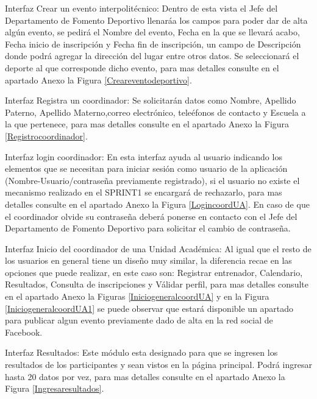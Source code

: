 	\noindent Interfaz Crear un evento interpolitécnico: Dentro de esta vista el Jefe del Departamento de Fomento Deportivo llenaráa los campos para poder dar de alta algún evento, se pedirá el Nombre del evento, Fecha en la que se llevará acabo, Fecha inicio de inscripción y Fecha fin de inscripción, un campo de Descripción donde podrá agregar la dirección del lugar entre otros datos. Se seleccionará el deporte al que corresponde dicho evento, para mas detalles consulte en el apartado Anexo la Figura \ref{Creareventodeportivo}.
	\newline

	\noindent Interfaz Registra un coordinador: Se solicitarán datos como Nombre, Apellido Paterno, Apellido Materno,correo electrónico, teleéfonos de contacto y Escuela a la que pertenece, para mas detalles consulte en el apartado Anexo la Figura \ref{Registrocoordinador}.
	\pagebreak
	
	\noindent Interfaz login coordinador: En esta interfaz ayuda al usuario indicando los elementos que se necesitan para iniciar sesión como usuario de la aplicación (Nombre-Usuario/contraseña previamente registrado), si el usuario no existe el mecanismo realizado en el SPRINT1 se encargará de rechazarlo, para mas detalles consulte en el apartado Anexo la Figura \ref{LogincoordUA}. En caso de que el coordinador olvide su contraseña deberá ponerse en contacto con el Jefe del Departamento de Fomento Deportivo para solicitar el cambio de contraseña.
	\newline
	
	\noindent Interfaz  Inicio del coordinador de una Unidad Académica: Al igual que el resto de los usuarios en general tiene un diseño muy similar, la diferencia recae en las opciones que puede realizar, en este caso son: Registrar entrenador, Calendario, Resultados, Consulta de inscripciones y Válidar perfil, para mas detalles consulte en el apartado Anexo la Figuras 	\ref{IniciogeneralcoordUA} y en la Figura \ref{IniciogeneralcoordUA1} se puede observar que estará disponible un apartado para publicar algun evento previamente dado de alta en la red social de Facebook.
	\newline
	
	\noindent Interfaz Resultados: Este módulo esta designado para que se ingresen los resultados de los participantes y sean vistos en la página principal. Podrá ingresar hasta 20 datos por vez, para mas detalles consulte en el apartado Anexo la Figura \ref{Ingresaresultados}.
	\newline
	
